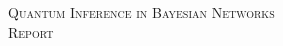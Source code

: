\documentclass{article}
\author{Thierry Rioual}
\date{}
\begin{document}
\begin{adjustbox}{minipage=1.2\textwidth, center}
\begin{center}
\textsc{\Large Quantum Inference in Bayesian Networks}
\\[5pt]
\textsc{\large Report}  
\end{center}
\end{adjustbox}









\printbibliography
\end{document}

